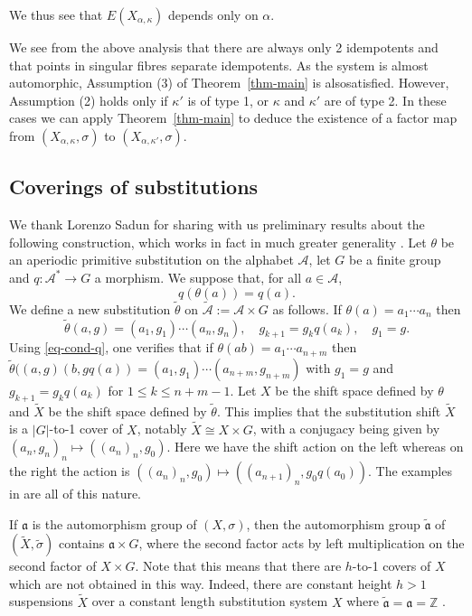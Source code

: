 \documentclass[10pt,a4paper]{amsart}
\numberwithin{equation}{section}
\newcommand{\Aa}{{\mathcal A}}
\newcommand{\aut}{{\mathfrak a}}
\newcommand{\al}{\alpha}
\newcommand{\cut}{\kappa}
\begin{document}
We thus see that $E(X_{\al,\cut})$ depends only on $\al$. 

We see from the above analysis that there are always only 2 idempotents and that points in singular fibres separate idempotents. As the system is almost automorphic, Assumption (3) of Theorem~\ref{thm-main} is  alsosatisfied. However, Assumption (2) holds only if $\cut'$ is of type 1, or $\cut$ and $\cut'$ are of type 2. In these cases we can apply Theorem~\ref{thm-main} to deduce the existence of a factor map from $(X_{\al,\cut},\sigma)$ to $(X_{\al,\cut'},\sigma)$.  


\subsection{Coverings of substitutions}\label{sec:coverings}
We thank Lorenzo Sadun for sharing with us preliminary results about the following construction, which works in fact in much greater generality \cite{Sadun}.
Let $\theta$ be an aperiodic primitive substitution on the alphabet $\Aa$, let $G$ be a finite group and 
$q:\Aa^*\to G$ a morphism. We suppose that, for all $a\in \Aa$, 
\begin{equation}\label{eq-cond-q}
   q(\theta(a)) = q(a).    
\end{equation}
We define a new substitution $\tilde \theta$ on $\tilde\Aa:=\Aa\times G$ as follows. If $\theta(a) = a_1\cdots a_n$ then
$$\tilde\theta(a,g) = (a_1,g_1)\cdots (a_n,g_n),\quad g_{k+1} = g_k q(a_k),\quad g_1 = g.$$
Using \eqref{eq-cond-q},
 one verifies that if 
$\theta(ab) = a_1\cdots a_{n+m}$ then  
$\tilde\theta((a,g)(b,gq(a)) = (a_1,g_1)\cdots (a_{n+m},g_{n+m})$ with $ g_1 = g$ and $g_{k+1} = g_k q(a_k)$ for  $1\leq k \leq n+m-1$.  Let $X$ be the shift space defined by $\theta$ and $\tilde X$ be the shift space defined by $\tilde \theta$. This implies that the substitution shift $\tilde X$ is a $|G|$-to-1 cover of $ X$, notably  $\tilde X\cong  X\times G$, with a conjugacy being given by $(a_n,g_n)_n\mapsto ((a_n)_n,g_0)$. Here we have the shift action on the left whereas on the right the action is $((a_n)_n,g_0)\mapsto ((a_{n+1})_n,g_0q(a_0))$. The examples in  \cite{BARGE-BRUIN-Jones-Sadun:2012} are all of this nature.


If $\aut$ is the automorphism group  of $ (X,\sigma)$, then the automorphism group $\tilde\aut$ of $(\tilde X,\tilde\sigma)$ contains $\aut\times G$, where the second factor acts by left multiplication on the second factor of $X\times G$. Note that this means that there are $h$-to-1 covers of $ X$ which are not obtained in this way. Indeed, there are constant height $h>1$ suspensions $\tilde X$ over a constant length substitution system $ X$ where $\tilde\aut=\aut=\mathbb Z$ \cite{CQY}. 
\end{document}

